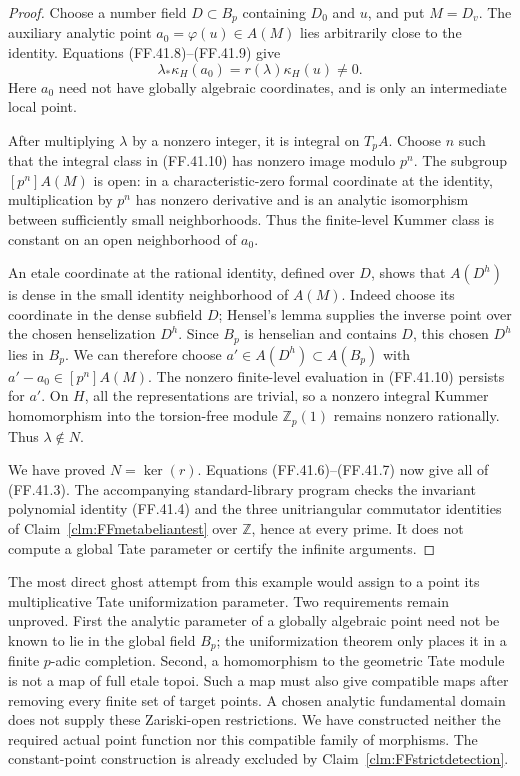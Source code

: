 \begin{proof}
Choose a number field
\(D\subset B_p\) containing \(D_0\)
and \(u\), and put \(M=D_v\).
The auxiliary analytic point
\(a_0=\varphi(u)\in A(M)\) lies
arbitrarily close to the identity.
Equations (FF.41.8)--(FF.41.9) give
\[
        \lambda_*\kappa_H(a_0)
              =r(\lambda)\kappa_H(u)\ne0.
                                                        \tag{FF.41.10}
\]
Here \(a_0\) need not have globally
algebraic coordinates, and is only
an intermediate local point.

After multiplying \(\lambda\) by
a nonzero integer, it is integral
on \(T_pA\). Choose \(n\) such
that the integral class in
(FF.41.10) has nonzero image modulo
\(p^n\). The subgroup
\([p^n]A(M)\) is open: in a
characteristic-zero formal coordinate
at the identity, multiplication by
\(p^n\) has nonzero derivative and
is an analytic isomorphism between
sufficiently small neighborhoods.
Thus the finite-level Kummer class
is constant on an open neighborhood
of \(a_0\).

An etale coordinate at the rational
identity, defined over \(D\), shows
that \(A(D^h)\) is dense in the
small identity neighborhood of
\(A(M)\). Indeed choose its coordinate
in the dense subfield \(D\); Hensel's
lemma supplies the inverse point
over the chosen henselization
\(D^h\). Since \(B_p\) is henselian
and contains \(D\), this chosen
\(D^h\) lies in \(B_p\). We can
therefore choose
\(a'\in A(D^h)\subset A(B_p)\)
with \(a'-a_0\in[p^n]A(M)\).
The nonzero finite-level evaluation
in (FF.41.10) persists for \(a'\).
On \(H\), all the representations
are trivial, so a nonzero integral
Kummer homomorphism into the
torsion-free module \(\mathbb Z_p(1)\)
remains nonzero rationally.
Thus \(\lambda\notin N\).

We have proved \(N=\ker(r)\).
Equations (FF.41.6)--(FF.41.7)
now give all of (FF.41.3).
The accompanying standard-library program
checks the invariant polynomial identity
(FF.41.4) and the three unitriangular
commutator identities of
Claim~\ref{clm:FFmetabeliantest} over
\(\mathbb Z\), hence at every prime.
It does not compute a global Tate
parameter or certify the infinite arguments.
\end{proof}

The most direct ghost attempt from
this example would assign to a
point its multiplicative Tate
uniformization parameter. Two
requirements remain unproved.
First the analytic parameter of
a globally algebraic point need
not be known to lie in the global
field \(B_p\); the uniformization
theorem only places it in a finite
\(p\)-adic completion. Second, a
homomorphism to the geometric
Tate module is not a map of full
etale topoi. Such a map must also
give compatible maps after removing
every finite set of target points.
A chosen analytic fundamental
domain does not supply these
Zariski-open restrictions. We have
constructed neither the required
actual point function nor this
compatible family of morphisms.
The constant-point construction is
already excluded by
Claim~\ref{clm:FFstrictdetection}.
